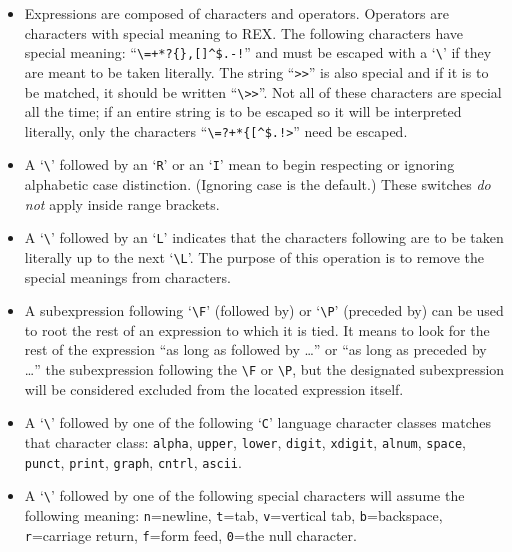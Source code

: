 \begin{itemize}
\item  Expressions are composed of characters and operators.  Operators
       are characters with special meaning to REX. The following
       characters have special meaning: ``\verb`\=+*?{},[]^$.-!`'' and must
       be escaped with a `\verb`\`' if they are meant to be taken literally.
       The string ``\verb`>>`'' is also special and if it is to be matched,
       it should be written ``\verb`\>>`''.  Not all of these characters are
       special all the time; if an entire string is to be escaped so it
       will be interpreted literally, only the characters ``\verb`\=?+*{[^$.!>`''
       need be escaped.

\item  A `\verb`\`' followed by an `\verb`R`' or an `\verb`I`' mean to begin
       respecting or ignoring alphabetic case distinction. (Ignoring case is
       the default.) These switches {\em do not} apply inside range brackets.

\item  A `\verb`\`' followed by an `\verb`L`' indicates that the characters
       following are to be taken literally up to the next `\verb`\L`'. The
       purpose of this operation is to remove the special meanings from
       characters.

\item  A subexpression following `\verb`\F`' (followed by) or `\verb`\P`'
       (preceded by) can be used to root the rest of an expression to which
       it is tied.  It means to look for the rest of the expression ``as long as followed
       by \ldots'' or ``as long as preceded by \ldots'' the subexpression
       following the \verb`\F` or \verb`\P`, but the designated subexpression will be
       considered excluded from the located expression itself.

\item  A `\verb`\`' followed by one of the following `\verb`C`' language character
       classes matches that character class: \verb`alpha`, \verb`upper`, \verb`lower`,
       \verb`digit`, \verb`xdigit`, \verb`alnum`, \verb`space`, \verb`punct`,
       \verb`print`, \verb`graph`, \verb`cntrl`, \verb`ascii`.

\item  A `\verb`\`' followed by one of the following special characters
       will assume the following meaning: \verb`n`=newline, \verb`t`=tab,
       \verb`v`=vertical tab, \verb`b`=backspace, \verb`r`=carriage return,
       \verb`f`=form feed, \verb`0`=the null character.


\end{itemize}
